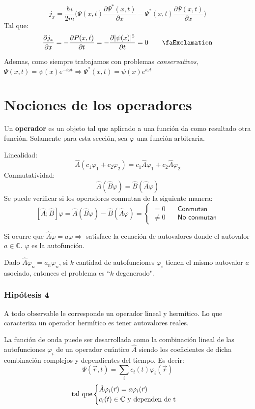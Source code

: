 \documentclass[10pt,twocolumn,titlepage]{article}
\newcommand{\ojo}{\text{\faExclamation}}
\newcommand{\spartial}[2]{\frac{\partial #1}{\partial #2}}
\newcommand{\Psixt}{\Psi (x,t)}
\newcommand{\psix}{\psi (x)}
\newcommand{\inpar}[1]{\Bigg( #1 \Bigg)} %
\begin{document}
$$j_x=\frac{\hbar i}{2m} \inpar{\Psixt  \spartial{\Psi^*(x,t)}{x} -\Psi^*(x,t) \spartial{\Psixt}{x} } $$ 
Tal que:
$$\spartial{j_x}{x}=-\spartial{P(x,t)}{t}=-\spartial{|\psi(x)|^2}{t}=0 \qquad \ojo$$

Ademas, como siempre trabajamos con problemas \emph{conservativos}, $\Psixt=\psix e^{-i\omega t}\Rightarrow\Psi^*(x,t)=\psi(x)e^{i\omega t}$

\section{Nociones de los operadores}
Un \textbf{operador} es un objeto tal que aplicado a una función da como resultado otra función. Solamente para esta sección, sea $\varphi$ una función arbitraria.

Linealidad:
$$ \hat{A}(c_1\varphi_1+c_2\varphi_2)=c_1\hat{A}\varphi_1+c_2\hat{A}\varphi_2 $$
Conmutatividad:
$$\hat{A}(\hat{B}\varphi)=\hat{B}(\hat{A}\varphi) $$
Se puede verificar si los operadores conmutan de la siguiente manera:
\[
[\hat{A};\hat{B}]\varphi=\hat{A}(\hat{B}\varphi)-\hat{B}(\hat{A}\varphi)=
\begin{cases}
=0&\quad \textsf{Conmutan} \\
\neq 0&\quad \textsf{No conmutan}
\end{cases}
\]

Si ocurre que $\hat{A}\varphi=a\varphi \Rightarrow$ satisface la ecuación de autovalores donde el autovalor $a \in \mathbb{C}$. $\varphi$ es la autofunción.

Dado $\hat{A}\varphi_n = a_n \varphi_n$, si $k$ cantidad de autofunciones $\varphi_i$ tienen el mismo autovalor $a$ asociado, entonces el problema es ``$k$ degenerado".
\subsubsection*{Hipótesis 4}
A todo observable le corresponde un operador lineal y hermítico. Lo que caracteriza un operador hermítico es tener autovalores reales.

La función de onda puede ser desarrollada como la combinación lineal de las autofunciones $\varphi_i$ de un operador cuántico $\hat{A}$ siendo los coeficientes de dicha combinación complejos y dependientes del tiempo. Es decir:
$$ \Psi(\vec{r},t)=\sum_i c_i(t) \varphi_i(\vec{r}) $$
\[ \text{tal que} \begin{cases}
 \hat{A}\varphi_i(\vec{r}) =a\varphi_i(\vec{r})& \\
c_i(t) \in \mathbb{C} \text{  y dependen de } $t$ 
\end{cases}
\]
\end{document}
